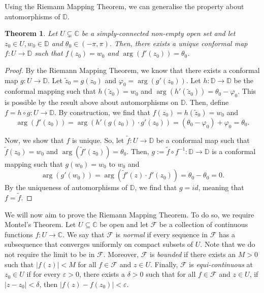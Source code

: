 \documentclass[a4paper, openany]{memoir}
\theoremstyle{definition}
\theoremstyle{plain}
\newtheorem{theorem}[definition]{Theorem}
\begin{document}
    Using the Riemann Mapping Theorem, we can generalise the property about automorphisms of $\mathbb{D}$.
    \begin{theorem}
        Let $U \subsetneq \mathbb{C}$ be a simply-connected non-empty open set and let $z_0 \in U, w_0 \in \mathbb{D}$ and $\theta_0 \in (-\pi, \pi)$. Then, there exists a unique conformal map $f \colon U \to \mathbb{D}$ such that $f(z_0) = w_0$ and $\arg (f'(z_0)) = \theta_0$.
    \end{theorem}
    \begin{proof}
        By the Riemann Mapping Theorem, we know that there exists a conformal map $g \colon U \to \mathbb{D}$. Let $\tilde{z}_0 = g(z_0)$ and $\varphi_0 = \arg (g'(z_0))$. Let $h \colon \mathbb{D} \to \mathbb{D}$ be the conformal mapping such that $h(\tilde{z}_0) = w_0$ and $\arg (h'(\tilde{z}_0)) = \theta_0 - \varphi_0$. This is possible by the result above about automorphisms on $\mathbb{D}$. Then, define $f = h \circ g \colon U \to \mathbb{D}$. By construction, we find that $f(z_0) = h(\tilde{z}_0) = w_0$ and 
        \[\arg (f'(z_0)) = \arg (h'(g(z_0)) \cdot g'(z_0)) = (\theta_0 - \varphi_0) + \varphi_0 = \theta_0.\]

        Now, we show that $f$ is unique. So, let $\tilde{f} \colon U \to \mathbb{D}$ be a conformal map such that $\tilde{f}(z_0) = w_0$ and $\arg (\tilde{f}'(z_0)) = \theta_0$. Then, $g := \tilde{f} \circ f^{-1} \colon \mathbb{D} \to \mathbb{D}$ is a conformal mapping such that $g(w_0) = w_0$ to $w_0$ and 
        \[\arg(g'(w_0)) = \arg (\tilde{f}'(z) \cdot f'(z_0)) = \theta_0 - \theta_0 = 0.\]
        By the uniqueness of automorphisms of $\mathbb{D}$, we find that $g = id$, meaning that $f = \tilde{f}$.
    \end{proof}

    We will now aim to prove the Riemann Mapping Theorem. To do so, we require Montel's Theorem. Let $U \subseteq \mathbb{C}$ be open and let $\mathcal{F}$ be a collection of continuous functions $f \colon U \to \mathbb{C}$. We say that $\mathcal{F}$ is \emph{normal} if every sequence in $\mathcal{F}$ has a subsequence that converges uniformly on compact subsets of $U$. Note that we do not require the limit to be in $\mathcal{F}$. Moreover, $\mathcal{F}$ is \emph{bounded} if there exists an $M > 0$ such that $|f(z)| < M$ for all $f \in \mathcal{F}$ and $z \in U$. Finally, $\mathcal{F}$ is \emph{equi-continuous} at $z_0 \in U$ if for every $\varepsilon > 0$, there exists a $\delta > 0$ such that for all $f \in \mathcal{F}$ and $z \in U$, if $|z - z_0| < \delta$, then $|f(z) - f(z_0)| < \varepsilon$.
    
\end{document}
